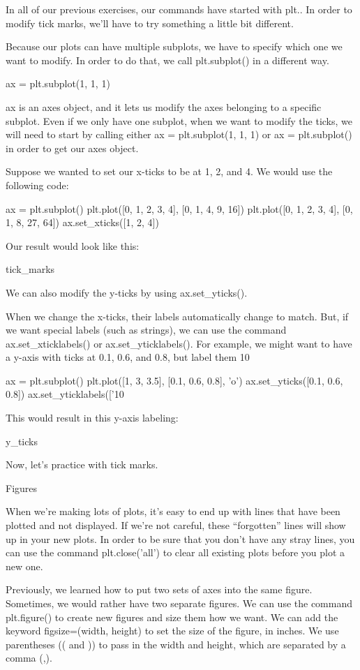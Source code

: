 \documentclass{journal}
\begin{document}
In all of our previous exercises, our commands have started with plt.. In order to modify tick marks, we’ll have to try something a little bit different.

Because our plots can have multiple subplots, we have to specify which one we want to modify. In order to do that, we call plt.subplot() in a different way.

ax = plt.subplot(1, 1, 1)

ax is an axes object, and it lets us modify the axes belonging to a specific subplot. Even if we only have one subplot, when we want to modify the ticks, we will need to start by calling either ax = plt.subplot(1, 1, 1) or ax = plt.subplot() in order to get our axes object.

Suppose we wanted to set our x-ticks to be at 1, 2, and 4. We would use the following code:

ax = plt.subplot()
plt.plot([0, 1, 2, 3, 4], [0, 1, 4, 9, 16])
plt.plot([0, 1, 2, 3, 4], [0, 1, 8, 27, 64])
ax.set_xticks([1, 2, 4])

Our result would look like this:

tick_marks

We can also modify the y-ticks by using ax.set_yticks().

When we change the x-ticks, their labels automatically change to match. But, if we want special labels (such as strings), we can use the command ax.set_xticklabels() or ax.set_yticklabels(). For example, we might want to have a y-axis with ticks at 0.1, 0.6, and 0.8, but label them 10%

ax = plt.subplot()
plt.plot([1, 3, 3.5], [0.1, 0.6, 0.8], 'o')
ax.set_yticks([0.1, 0.6, 0.8])
ax.set_yticklabels(['10%

This would result in this y-axis labeling:

y_ticks

Now, let’s practice with tick marks.


Figures

When we’re making lots of plots, it’s easy to end up with lines that have been plotted and not displayed. If we’re not careful, these “forgotten” lines will show up in your new plots. In order to be sure that you don’t have any stray lines, you can use the command plt.close('all') to clear all existing plots before you plot a new one.

Previously, we learned how to put two sets of axes into the same figure. Sometimes, we would rather have two separate figures. We can use the command plt.figure() to create new figures and size them how we want. We can add the keyword figsize=(width, height) to set the size of the figure, in inches. We use parentheses (( and )) to pass in the width and height, which are separated by a comma (,).
\end{document}
